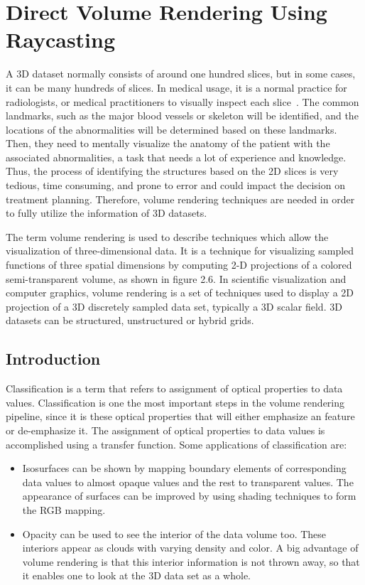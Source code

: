 

\chapter{Direct Volume Rendering Using Raycasting}\label{chap:errors}


A 3D dataset normally consists of around one hundred slices, but in some cases, it can be many hundreds of slices. In medical usage, it is a normal practice for radiologists, or medical practitioners to visually inspect each slice~\cite{62}. The common landmarks, such as the major blood vessels or skeleton will be identified, and the locations of the abnormalities will be determined based on these landmarks. Then, they need to mentally visualize the anatomy of the patient with the associated abnormalities,  a task that needs a lot of experience and knowledge. Thus, the process of identifying the structures based on the 2D slices is very tedious, time consuming, and prone to error and could impact the decision on treatment planning. Therefore, volume rendering techniques are needed in order to fully utilize the information of 3D datasets.

The term volume rendering is used to describe techniques which allow the visualization of three-dimensional data. It is a technique for visualizing sampled functions of three spatial dimensions by computing 2-D projections of a colored semi-transparent volume, as shown in figure 2.6. In scientific visualization and computer graphics, volume rendering is a set of techniques used to display a 2D projection of a 3D discretely sampled data set, typically a 3D scalar field. 3D datasets can be structured, unstructured or hybrid grids. 


\section{Introduction}

Classification is a term that refers to assignment of optical properties to data values. Classification is one the most important steps in the volume rendering pipeline, since it is these optical properties that will either emphasize an feature or de-emphasize it. The assignment of optical properties to data values is accomplished using a transfer function. Some applications of classification are:

\begin{itemize}

\item Isosurfaces can be shown by mapping boundary elements of corresponding data values to almost opaque values and the rest to transparent values. The appearance of surfaces can be improved by using shading techniques to form the RGB mapping. 

\item Opacity can be used to see the interior of the data volume too. These interiors appear as clouds with varying density and color. A big advantage of volume rendering is that this interior information is not thrown away, so that it enables one to look at the 3D data set as a whole. 

\end{itemize}

